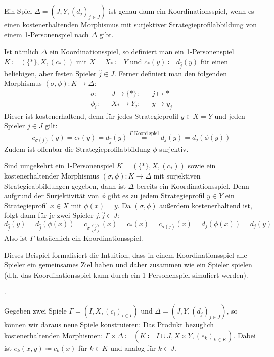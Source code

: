 \begin{bsp}\label{bsp:Koordinationsspiel}
	Ein Spiel $\Delta = (J, Y, (d_j)_{j \in J})$ ist genau dann ein Koordinationsspiel, wenn es einen kostenerhaltenden Morphismus mit surjektiver Strategieprofilabbildung von einem 1-Personenspiel nach $\Delta$ gibt.
	
	Ist nämlich $\Delta$ ein Koordinationsspiel, so definiert man ein 1-Personenspiel $K \coloneqq (\{\ast\}, X, (c_\ast))$ mit $X = X_\ast \coloneqq Y$ und $c_\ast(y) \coloneqq d_{\hat{j}}(y)$ für einen beliebigen, aber festen Spieler $\hat{j} \in J$. Ferner definiert man den folgenden Morphismus $(\sigma, \phi): K \to \Delta$:
	\begin{align*}
		\sigma:	&&J		\to	 \{\ast\}:	&&j	\mapsto	\ast  \\
		\phi_i:	&&X_\ast	\to	 Y_j:	&&y	\mapsto	y_j
	\end{align*}	
	Dieser ist kostenerhaltend, denn für jedes Strategieprofil $y \in X = Y$ und jeden Spieler $j \in J$ gilt:
	\[c_{\sigma(j)}(y) = c_\ast(y) = d_{\hat{j}}(y) \overset{\Gamma \text{ Koord.spiel}}{=} d_j(y) = d_j(\phi(y))\]
	Zudem ist offenbar die Strategieprofilabbildung $\phi$ surjektiv.
	
	Sind umgekehrt ein 1-Personenspiel $K = (\{\ast\}, X, (c_\ast))$ sowie ein kostenerhaltender Morphismus  $(\sigma, \phi): K \to \Delta$ mit surjektiven Strategieabbildungen gegeben, dann ist $\Delta$ bereits ein Koordinationsspiel. Denn aufgrund der Surjektivität von $\phi$ gibt es zu jedem Strategieprofil $y \in Y$ ein Strategieprofil $x \in X$ mit $\phi(x) = y$. Da $(\sigma, \phi)$ außerdem kostenerhaltend ist, folgt dann für je zwei Spieler $j, \hat{j} \in J$: 
		\[d_{\hat{j}}(y) = d_{\hat{j}}(\phi(x)) = c_{\sigma(\hat{j})}(x) = c_\ast(x) = c_{\sigma(j)}(x) = d_j(\phi(x)) = d_j(y)\]
	Also ist $\Gamma$ tatsächlich ein Koordinationsspiel.
\end{bsp}

Dieses Beispiel formalisiert die Intuition, dass in einem Koordinationsspiel alle Spieler ein gemeinsames Ziel haben und daher zusammen \glqq wie ein Spieler\grqq{} spielen (d.h. das Koordinationsspiel kann durch ein 1-Personenspiel simuliert werden).

\begin{bsp}.
	
\end{bsp}

\begin{bsp}
	Gegeben zwei Spiele $\Gamma = (I, X, (c_i)_{i\in I})$ und $\Delta = (J, Y, (d_j)_{j\in J})$, so können wir daraus neue Spiele konstruieren: Das Produkt bezüglich kostenerhaltenden Morphismen: $\Gamma \times \Delta \coloneqq (K \coloneqq I \dot{\cup} J, X\times Y, (e_k)_{k \in K})$. Dabei ist $e_k(x,y) \coloneqq c_k(x)$ für $k \in K$ und analog für $k \in J$. 
\end{bsp}


